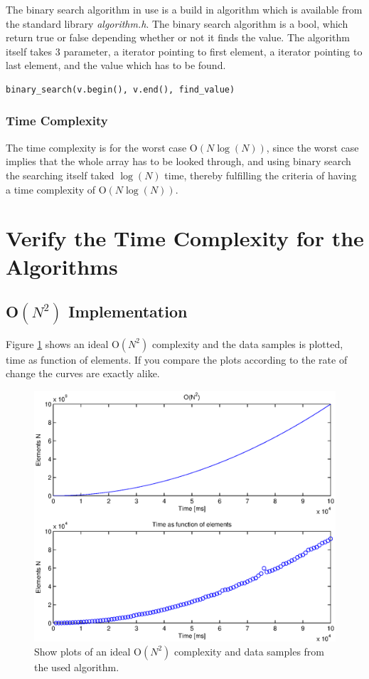 The binary search algorithm in use is a build in algorithm which is available from the standard library \emph{algorithm.h}. The binary search algorithm is a bool, which return true or false depending whether or not it finds the value. The algorithm itself takes 3 parameter, a iterator pointing to first element, a iterator pointing to last element, and the value which has to be found. 
\begin{lstlisting}
binary_search(v.begin(), v.end(), find_value)
\end{lstlisting}

\subsubsection{Time Complexity}
The time complexity is for the worst case O\(\left( N\log {(N)}  \right) \), since the worst case implies that the whole array has to be looked through, and using binary search the searching itself taked \( \log {(N)} \) time, thereby fulfilling the criteria of having a time complexity of O\(\left( N\log {(N)}  \right) \).  



\section{Verify the Time Complexity for the Algorithms}
\subsection{O\(\left( { N }^{ 2 } \right)\) Implementation}
Figure \ref{fig:test1} shows an ideal O\(\left( { N }^{ 2 } \right)\) complexity and the data samples is plotted, time as function of elements. If you compare the plots according to the rate of change the curves are exactly alike. 
\begin{figure}[th!]
\centering
\includegraphics[width=1\textwidth]{./graphics/test1.eps}
\caption{Show plots of an ideal O\(\left( { N }^{ 2 } \right)\) complexity and data samples from the used algorithm.}
\label{fig:test1}
\end{figure}
\newpage


